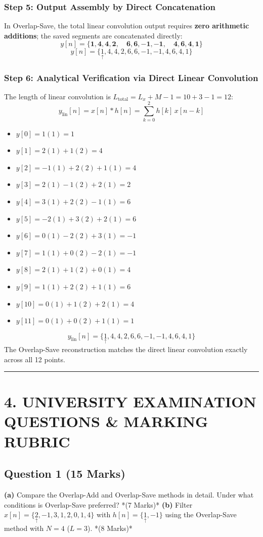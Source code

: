 \documentclass[11pt,a4paper]{article}
\begin{document}
\subsubsection*{Step 5: Output Assembly by Direct Concatenation}
In Overlap-Save, the total linear convolution output requires \textbf{zero arithmetic additions}; the saved segments are concatenated directly:
$$ y[n] = \{ \mathbf{1, 4, 4, 2}, \quad \mathbf{6, 6, -1, -1}, \quad \mathbf{4, 6, 4, 1} \} $$
$$ y[n] = \{ \underset{\uparrow}{1}, 4, 4, 2, 6, 6, -1, -1, 4, 6, 4, 1 \} $$

\subsubsection*{Step 6: Analytical Verification via Direct Linear Convolution}
The length of linear convolution is $L_{\text{total}} = L_x + M - 1 = 10 + 3 - 1 = 12$:
$$ y_{\text{lin}}[n] = x[n] * h[n] = \sum_{k=0}^{2} h[k] \, x[n - k] $$
\begin{itemize}
\item $y[0] = 1(1) = 1$
\item $y[1] = 2(1) + 1(2) = 4$
\item $y[2] = -1(1) + 2(2) + 1(1) = 4$
\item $y[3] = 2(1) - 1(2) + 2(1) = 2$
\item $y[4] = 3(1) + 2(2) - 1(1) = 6$
\item $y[5] = -2(1) + 3(2) + 2(1) = 6$
\item $y[6] = 0(1) - 2(2) + 3(1) = -1$
\item $y[7] = 1(1) + 0(2) - 2(1) = -1$
\item $y[8] = 2(1) + 1(2) + 0(1) = 4$
\item $y[9] = 1(1) + 2(2) + 1(1) = 6$
\item $y[10] = 0(1) + 1(2) + 2(1) = 4$
\item $y[11] = 0(1) + 0(2) + 1(1) = 1$

\end{itemize}
$$ y_{\text{lin}}[n] = \{ \underset{\uparrow}{1}, 4, 4, 2, 6, 6, -1, -1, 4, 6, 4, 1 \} $$
The Overlap-Save reconstruction matches the direct linear convolution exactly across all 12 points.

\noindent\rule{\textwidth}{0.5pt}
\section*{4. UNIVERSITY EXAMINATION QUESTIONS \& MARKING RUBRIC}

\subsection*{Question 1 (15 Marks)}
\textbf{(a)} Compare the Overlap-Add and Overlap-Save methods in detail. Under what conditions is Overlap-Save preferred? *(7 Marks)*
\textbf{(b)} Filter $x[n] = \{ \underset{\uparrow}{2}, -1, 3, 1, 2, 0, 1, 4 \}$ with $h[n] = \{ \underset{\uparrow}{1}, -1 \}$ using the Overlap-Save method with $N = 4$ ($L = 3$). *(8 Marks)*
\end{document}
